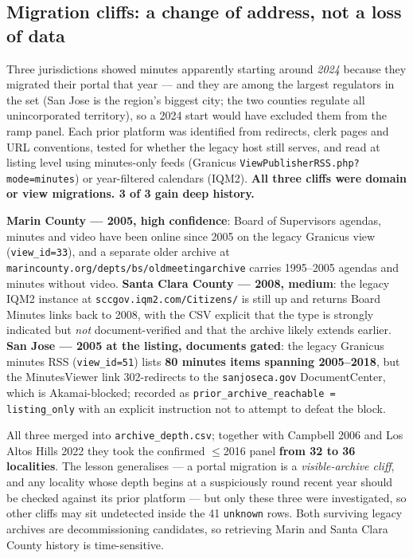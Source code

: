 \documentclass[11pt]{article}
\begin{document}
\subsection{Migration cliffs: a change of address, not a loss of data}

Three jurisdictions showed minutes apparently starting around \emph{2024} because they migrated
their portal that year --- and they are among the largest regulators in the set (San Jose is the
region's biggest city; the two counties regulate all unincorporated territory), so a 2024 start
would have excluded them from the ramp panel. Each prior platform was identified from redirects,
clerk pages and URL conventions, tested for whether the legacy host still serves, and read at
listing level using minutes-only feeds (Granicus \texttt{ViewPublisherRSS.php?mode=minutes}) or
year-filtered calendars (IQM2). \textbf{All three cliffs were domain or view migrations. 3 of 3
gain deep history.}

\textbf{Marin County --- 2005, high confidence}: Board of Supervisors agendas, minutes and video
have been online since 2005 on the legacy Granicus view (\texttt{view\_id=33}), and a separate
older archive at \texttt{marincounty.org/depts/bs/oldmeetingarchive} carries 1995--2005 agendas
and minutes without video. \textbf{Santa Clara County --- 2008, medium}: the legacy IQM2 instance
at \texttt{sccgov.iqm2.com/Citizens/} is still up and returns Board Minutes links back to 2008,
with the CSV explicit that the type is strongly indicated but \emph{not} document-verified and
that the archive likely extends earlier. \textbf{San Jose --- 2005 at the listing, documents
gated}: the legacy Granicus minutes RSS (\texttt{view\_id=51}) lists \textbf{80 minutes items
spanning 2005--2018}, but the MinutesViewer link 302-redirects to the \texttt{sanjoseca.gov}
DocumentCenter, which is Akamai-blocked; recorded as
\texttt{prior\_archive\_reachable = listing\_only} with an explicit instruction not to attempt to
defeat the block.

All three merged into \texttt{archive\_depth.csv}; together with Campbell 2006 and Los Altos
Hills 2022 they took the confirmed $\leq$2016 panel \textbf{from 32 to 36 localities}. The lesson
generalises --- a portal migration is a \emph{visible-archive cliff}, and any locality whose
depth begins at a suspiciously round recent year should be checked against its prior platform ---
but only these three were investigated, so other cliffs may sit undetected inside the 41
\texttt{unknown} rows. Both surviving legacy archives are decommissioning candidates, so
retrieving Marin and Santa Clara County history is time-sensitive.
\end{document}
